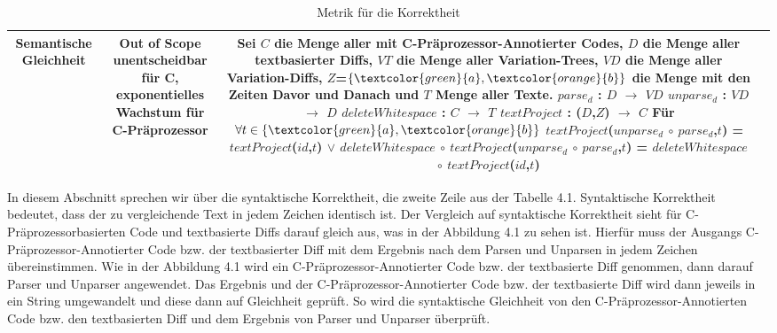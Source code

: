 \begin{table}[H]
\begin{center}
\begin{tabular}{ c||c|c|c| }
			\hline
			Semantische Gleichheit &  \parbox[][3cm][]{4cm}{Out of Scope\\
				unentscheidbar für C,\\
				exponentielles Wachstum für C-Präprozessor}  &  \parbox[][10.5cm][]{5cm}{Sei $C$ die Menge aller mit C-Präprozessor-Annotierter Codes, $D$ die Menge aller textbasierter Diffs, $VT$ die Menge aller Variation-Trees,  $VD$ die Menge aller Variation-Diffs, $Z$=$\{\textcolor{green}{a},\textcolor{orange}{b}\}$ die Menge mit den Zeiten Davor und Danach und $T$ Menge aller Texte.\\
				$parse_d$ : $D$ $\rightarrow$ $VD$\\
				$unparse_d$ : $VD$ $\rightarrow$ $D$\\
				$deleteWhitespace$ : $C$ $\rightarrow$ $T$\\
				$textProject$ : ($D$,$Z$) $\rightarrow$ $C$\\
				Für $\forall t \in \{\textcolor{green}{a},\textcolor{orange}{b}\}$\\
				$textProject$($unparse_d$ $\circ$ $parse_d$,$t$) = $textProject$($id$,$t$) $\lor$ $deleteWhitespace$ $\circ$ $textProject$($unparse_d$ $\circ$ $parse_d$,$t$) =  $deleteWhitespace$ $\circ$ $textProject$($id$,$t$)
			} \\
			\hline
		\end{tabular}
	\end{center}
	\caption{Metrik für die Korrektheit}
\end{table}


In diesem Abschnitt sprechen wir über die syntaktische Korrektheit, die zweite Zeile aus der Tabelle 4.1. Syntaktische Korrektheit bedeutet, dass der zu vergleichende Text in jedem Zeichen identisch ist. Der Vergleich auf syntaktische Korrektheit sieht für C-Präprozessorbasierten Code und textbasierte Diffs darauf gleich aus, was in der Abbildung 4.1 zu sehen ist. Hierfür muss der Ausgangs C-Präprozessor-Annotierter Code bzw. der textbasierter Diff mit dem Ergebnis nach dem Parsen und Unparsen in jedem Zeichen übereinstimmen. Wie in der Abbildung 4.1 wird ein C-Präprozessor-Annotierter Code bzw. der textbasierte Diff genommen, dann darauf Parser und Unparser angewendet. Das Ergebnis und der C-Präprozessor-Annotierter Code bzw. der textbasierte Diff wird dann jeweils in ein String umgewandelt und diese dann auf Gleichheit geprüft. So wird die syntaktische Gleichheit von den C-Präprozessor-Annotierten Code bzw. den textbasierten Diff und dem Ergebnis von Parser und Unparser überprüft.


